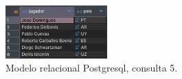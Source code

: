 \documentclass[11pt]{opticajnl}
\begin{document}
\begin{figure}[H]
\centering
\includegraphics[width=0.35\textwidth]{fotos/q5_rel.png}
\caption{Modelo relacional Postgresql, consulta 5.}
\label{fig:q5_rel}
\end{figure}









\end{document}

